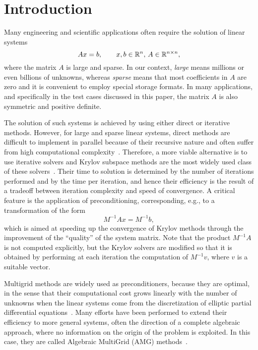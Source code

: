 \section{Introduction}

Many engineering and scientific applications often require the solution of
linear systems
 \begin{equation}
 Ax = b, \qquad x,b \in \Bbb{R}^n,\, A\in \Bbb{R}^{n\times n},
\label{eq:linsys}
\end{equation}
where the matrix $A$ is large and sparse. In our context, \emph{large}
means millions or even billions of unknowns, whereas
\emph{sparse} means that most coefficients in $A$ are zero and it is
convenient to employ special storage formats. In many applications,
and specifically in the test cases discussed in this paper, the matrix
$A$ is also symmetric and positive definite. 

The solution of such systems is achieved by using either direct or iterative methods. 
However, for large and sparse linear systems, direct methods are  difficult to implement in parallel
because of their recursive nature and often suffer from high computational complexity~\cite{Templates}.  
Therefore, a more viable alternative is to use iterative solvers and Krylov
subspace methods are the most widely used class of these solvers~\cite{MR1990645}. 
Their time to solution is determined by the number
of iterations performed and by the time per iteration, and hence their 
efficiency is the result of a tradeoff between iteration complexity and speed of convergence. 
A critical feature is the application of preconditioning,
corresponding, e.g., to a transformation of the form
\begin{equation}\label{eq:preclinsys}
M^{-1}Ax=M^{-1}b,
\end{equation} 
which is aimed at speeding up the convergence of Krylov methods through the improvement of
the ``quality'' of the system matrix. Note that the
product $M^{-1}A$ is not computed explicitly, but the Krylov solvers
are modified so that it is obtained by performing at each iteration
the computation of $M^{-1} v$, where $v$ is a suitable vector. 

Multigrid methods are widely used as preconditioners, because they are optimal,
in the sense that their computational cost grows linearly with the number of unknowns
when the linear systems come from the discretization of elliptic partial differential
equations~\cite{Vassilevski2008}.
Many efforts have been performed to extend their efficiency
to more general systems, often the direction of a complete
algebraic approach, where no information on the origin of the problem
is exploited. In this case, they are called Algebraic MultiGrid (AMG) methods~\cite{Stuben2001}.

